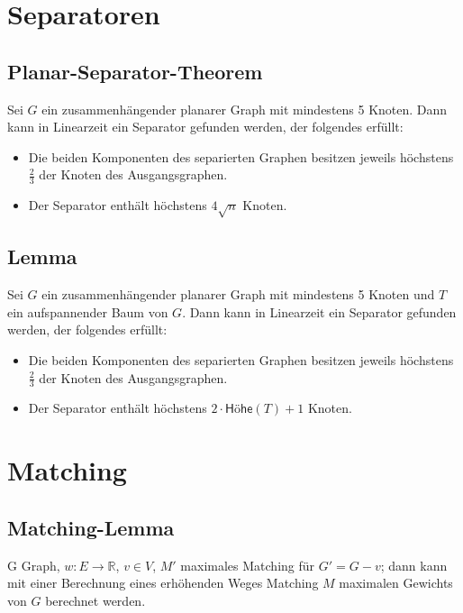 \documentclass{article}
\newcommand{\R}{\mathbb{R}}
\begin{document}
\section{Separatoren}
\subsection{Planar-Separator-Theorem}
Sei $G$ ein zusammenhängender planarer Graph mit mindestens 5 Knoten. Dann kann in Linearzeit ein Separator gefunden werden, der folgendes erfüllt:
\begin{itemize}
\item Die beiden Komponenten des separierten Graphen besitzen jeweils höchstens $\frac{2}{3}$ der Knoten des Ausgangsgraphen.
\item Der Separator enthält höchstens $4 \sqrt{n}$ Knoten.
\end{itemize}

\subsection{Lemma}
Sei $G$ ein zusammenhängender planarer Graph mit mindestens 5 Knoten und $T$ ein aufspannender Baum von $G$. Dann kann in Linearzeit ein Separator gefunden werden, der folgendes erfüllt:
\begin{itemize}
\item Die beiden Komponenten des separierten Graphen besitzen jeweils höchstens $\frac{2}{3}$ der Knoten des Ausgangsgraphen.
\item Der Separator enthält höchstens $2 \cdot \textsf{Höhe}(T) + 1$ Knoten.
\end{itemize}

\section{Matching}


\subsection{Matching-Lemma}
G Graph, $w : E \rightarrow \R$, $v\in V$, $M'$ maximales Matching für $G' = G -v$; dann kann mit einer Berechnung eines erhöhenden Weges Matching $M$ maximalen Gewichts von $G$ berechnet werden.
\end{document}
